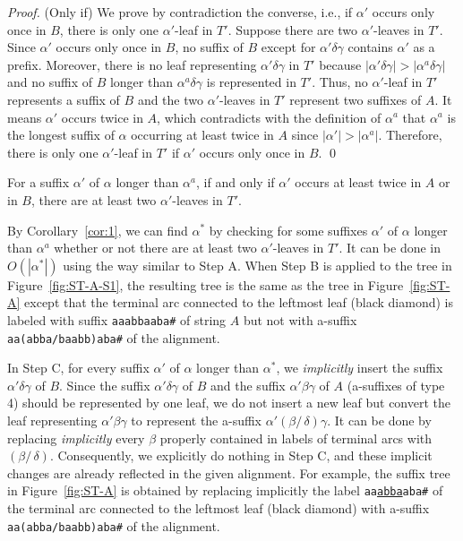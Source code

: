 \documentclass{llncs}
\newcommand{\partitle}[1]{}                        \newcommand{\commentout}[1]{}
\begin{document}
\begin{proof}
(Only if) We prove by contradiction the converse,
        i.e., if $\alpha'$ occurs only once in $B$,
        there is only one $\alpha'$-leaf in $T'$.
    Suppose there are two $\alpha'$-leaves in $T'$.
    Since $\alpha'$ occurs only once in $B$,
     no suffix of $B$ except for $\alpha'\delta\gamma$ contains $\alpha'$ as a prefix.
    Moreover, there is no leaf representing $\alpha'\delta\gamma$ in $T'$
     because $|\alpha'\delta\gamma| > |\alpha^{a}\delta\gamma|$ and
     no suffix of $B$ longer than $\alpha^{a}\delta\gamma$ is represented in $T'$.
    Thus, no $\alpha'$-leaf in $T'$ represents a suffix of $B$
     and the two $\alpha'$-leaves in $T'$ represent two suffixes of $A$.
    It means $\alpha'$ occurs twice in $A$,
     which contradicts with the definition of $\alpha^{a}$
     that $\alpha^{a}$ is the longest suffix of $\alpha$
     occurring at least twice in $A$
     since $|\alpha'| > |\alpha^{a}|$.
    Therefore, there is only one $\alpha'$-leaf in $T'$
     if $\alpha'$ occurs only once in $B$.
\qed
\end{proof}


\begin{corollary}  \label{cor:1}
For a suffix $\alpha'$ of $\alpha$ longer than $\alpha^{a}$,
 if and only if $\alpha'$ occurs at least twice in $A$ or in $B$,
 there are at least two $\alpha'$-leaves in $T'$.
\end{corollary}
By Corollary~\ref{cor:1}, we can find $\alpha^{*}$
 by checking for some suffixes $\alpha'$ of $\alpha$ longer than $\alpha^{a}$
 whether or not there are at least two $\alpha'$-leaves in $T'$.
It can be done in $O(|\alpha^{*}|)$ using the way similar to Step A.
When Step B is applied to the tree in Figure~\ref{fig:ST-A-S1},
 the resulting tree is the same as the tree in Figure~\ref{fig:ST-A}
 except that the terminal arc connected to the leftmost leaf (black diamond)
  is labeled with suffix {\tt aaabbaaba\#} of string $A$
  but not with a-suffix {\tt aa(abba/baabb)aba\#} of the alignment.



\partitle{type 4}

In Step C, for every suffix $\alpha'$ of $\alpha$ longer than $\alpha^{*}$,
 we {\em implicitly} insert the suffix $\alpha' \delta \gamma$ of $B$.
Since the suffix $\alpha' \delta \gamma$ of $B$ and the suffix $\alpha'\beta\gamma$ of $A$
 (a-suffixes of type 4) should be represented by one leaf,
 we do not insert a new leaf but convert the leaf representing $\alpha' \beta \gamma$
 to represent the a-suffix $\alpha' (\beta /\, \delta)\gamma$.
It can be done by replacing {\em implicitly}
 every $\beta$ properly contained in labels of terminal arcs
 with $(\beta /\, \delta)$.
Consequently, we explicitly do nothing in Step C,
 and these implicit changes are already reflected in the given alignment.
For example, the suffix tree in Figure~\ref{fig:ST-A}
 is obtained by replacing implicitly the label {\tt aa\underline{abba}aba\#}
 of the terminal arc connected to the leftmost leaf (black diamond)
 with a-suffix {\tt aa(abba/baabb)aba\#} of the alignment.
\end{document}

